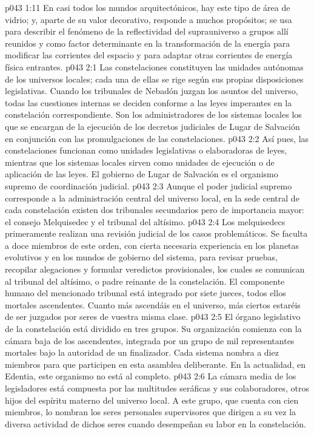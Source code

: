 \vs p043 1:11 En casi todos los mundos arquitectónicos, hay este tipo de área de vidrio; y, aparte de su valor decorativo, responde a muchos propósitos; se usa para describir el fenómeno de la reflectividad del suprauniverso a grupos allí reunidos y como factor determinante en la transformación de la energía para modificar las corrientes del espacio y para adaptar otras corrientes de energía física entrantes.
\vs p043 2:1 Las constelaciones constituyen las unidades autónomas de los universos locales; cada una de ellas se rige según sus propias disposiciones legislativas. Cuando los tribunales de Nebadón juzgan los asuntos del universo, todas las cuestiones internas se deciden conforme a las leyes imperantes en la constelación correspondiente. Son los administradores de los sistemas locales los que se encargan de la ejecución de los decretos judiciales de Lugar de Salvación en conjunción con las promulgaciones de las constelaciones.
\vs p043 2:2 Así pues, las constelaciones funcionan como unidades legislativas o elaboradoras de leyes, mientras que los sistemas locales sirven como unidades de ejecución o de aplicación de las leyes. El gobierno de Lugar de Salvación es el organismo supremo de coordinación judicial.
\vs p043 2:3 \pc Aunque el poder judicial supremo corresponde a la administración central del universo local, en la sede central de cada constelación existen dos tribunales secundarios pero de importancia mayor: el consejo Melquisedec y el tribunal del altísimo.
\vs p043 2:4 Los melquisedecs primeramente realizan una revisión judicial de los casos problemáticos. Se faculta a doce miembros de este orden, con cierta necesaria experiencia en los planetas evolutivos y en los mundos de gobierno del sistema, para revisar pruebas, recopilar alegaciones y formular veredictos provisionales, los cuales se comunican al tribunal del altísimo, o padre reinante de la constelación. El componente humano del mencionado tribunal está integrado por siete jueces, todos ellos mortales ascendentes. Cuanto más ascendáis en el universo, más ciertos estaréis de ser juzgados por seres de vuestra misma clase.
\vs p043 2:5 \pc El órgano legislativo de la constelación está dividido en tres grupos. Su organización comienza con la cámara baja de los ascendentes, integrada por un grupo de mil representantes mortales bajo la autoridad de un finalizador. Cada sistema nombra a diez miembros para que participen en esta asamblea deliberante. En la actualidad, en Edentia, este organismo no está al completo.
\vs p043 2:6 La cámara media de los legisladores está compuesta por las multitudes seráficas y sus colaboradores, otros hijos del espíritu materno del universo local. A este grupo, que cuenta con cien miembros, lo nombran los seres personales supervisores que dirigen a su vez la diversa actividad de dichos seres cuando desempeñan su labor en la constelación.
